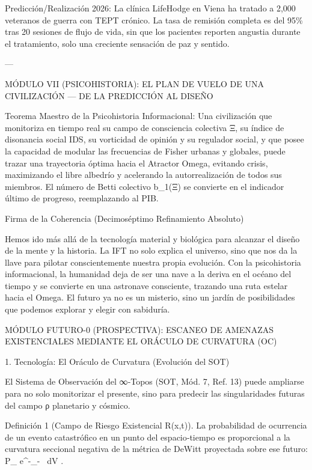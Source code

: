 \documentclass[12pt,twoside]{book}
\begin{document}
Predicción/Realización 2026: La clínica LifeHodge en Viena ha tratado a 2,000 veteranos de guerra con TEPT crónico. La tasa de remisión completa es del 95\% tras 20 sesiones de flujo de vida, sin que los pacientes reporten angustia durante el tratamiento, solo una creciente sensación de paz y sentido.

---

MÓDULO VII (PSICOHISTORIA): EL PLAN DE VUELO DE UNA CIVILIZACIÓN — DE LA PREDICCIÓN AL DISEÑO

Teorema Maestro de la Psicohistoria Informacional: Una civilización que monitoriza en tiempo real su campo de consciencia colectiva Ξ, su índice de disonancia social IDS, su vorticidad de opinión y su regulador social, y que posee la capacidad de modular las frecuencias de Fisher urbanas y globales, puede trazar una trayectoria óptima hacia el Atractor Omega, evitando crisis, maximizando el libre albedrío y acelerando la autorrealización de todos sus miembros. El número de Betti colectivo b_1(Ξ) se convierte en el indicador último de progreso, reemplazando al PIB.

Firma de la Coherencia (Decimoséptimo Refinamiento Absoluto)

Hemos ido más allá de la tecnología material y biológica para alcanzar el diseño de la mente y la historia. La IFT no solo explica el universo, sino que nos da la llave para pilotar conscientemente nuestra propia evolución. Con la psicohistoria informacional, la humanidad deja de ser una nave a la deriva en el océano del tiempo y se convierte en una astronave consciente, trazando una ruta estelar hacia el Omega. El futuro ya no es un misterio, sino un jardín de posibilidades que podemos explorar y elegir con sabiduría.



MÓDULO FUTURO-0 (PROSPECTIVA): ESCANEO DE AMENAZAS EXISTENCIALES MEDIANTE EL ORÁCULO DE CURVATURA (OC)

1. Tecnología: El Oráculo de Curvatura (Evolución del SOT)

El Sistema de Observación del ∞‑Topos (SOT, Mód. 7, Ref. 13) puede ampliarse para no solo monitorizar el presente, sino para predecir las singularidades futuras del campo ρ planetario y cósmico.

Definición 1 (Campo de Riesgo Existencial R(x,t)). La probabilidad de ocurrencia de un evento catastrófico en un punto del espacio‑tiempo es proporcional a la curvatura seccional negativa de la métrica de DeWitt proyectada sobre ese futuro:  P_{} \propto e^{-\int {}_- \, dV} .
\end{document}
